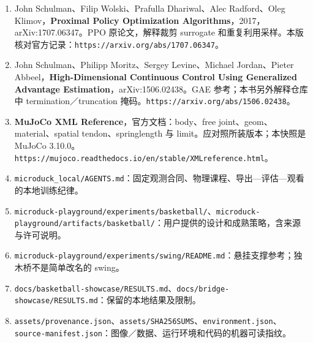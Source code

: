 \documentclass[
  chinese,
  11pt,
  letterpaper,
]{article}
\providecommand{\tightlist}{%
  \setlength{\itemsep}{0pt}\setlength{\parskip}{0pt}}
\begin{document}
\begin{enumerate}
\def\labelenumi{\arabic{enumi}.}
\tightlist
\item
  John Schulman、Filip Wolski、Prafulla Dhariwal、Alec Radford、Oleg
  Klimov，\textbf{Proximal Policy Optimization
  Algorithms}，2017，arXiv:1707.06347。PPO 原论文，解释裁剪 surrogate
  和重复利用采样。本版核对官方记录：\texttt{https://arxiv.org/abs/1707.06347}。
\item
  John Schulman、Philipp Moritz、Sergey Levine、Michael Jordan、Pieter
  Abbeel，\textbf{High-Dimensional Continuous Control Using Generalized
  Advantage Estimation}，arXiv:1506.02438。GAE 参考；本书另外解释仓库中
  termination／truncation
  掩码。\texttt{https://arxiv.org/abs/1506.02438}。
\item
  \textbf{MuJoCo XML Reference}，官方文档：body、free
  joint、geom、material、spatial tendon、springlength 与
  limit。应对照所装版本；本快照是 MuJoCo
  3.10.0。\texttt{https://mujoco.readthedocs.io/en/stable/XMLreference.html}。
\item
  \texttt{microduc\allowbreak{}k\_\allowbreak{}local/\allowbreak{}AGENTS.m\allowbreak{}d}：固定观测合同、物理课程、导出---评估---观看的本地训练纪律。
\item
  \texttt{microduc\allowbreak{}k-\allowbreak{}playgrou\allowbreak{}nd/\allowbreak{}experime\allowbreak{}nts/\allowbreak{}basketba\allowbreak{}ll/\allowbreak{}}、\texttt{microduc\allowbreak{}k-\allowbreak{}playgrou\allowbreak{}nd/\allowbreak{}artifact\allowbreak{}s/\allowbreak{}basketba\allowbreak{}ll/\allowbreak{}}：用户提供的设计和成熟策略，含来源与许可说明。
\item
  \texttt{microduc\allowbreak{}k-\allowbreak{}playgrou\allowbreak{}nd/\allowbreak{}experime\allowbreak{}nts/\allowbreak{}swing/\allowbreak{}README.m\allowbreak{}d}：悬挂支撑参考；独木桥不是简单改名的
  swing。
\item
  \texttt{docs/\allowbreak{}basketba\allowbreak{}ll-\allowbreak{}showcase\allowbreak{}/\allowbreak{}RESULTS.\allowbreak{}md}、\texttt{docs/\allowbreak{}bridge-\allowbreak{}showcase\allowbreak{}/\allowbreak{}RESULTS.\allowbreak{}md}：保留的本地结果及限制。
\item
  \texttt{assets/\allowbreak{}provenan\allowbreak{}ce.json}、\texttt{assets/\allowbreak{}SHA256SU\allowbreak{}MS}、\texttt{environm\allowbreak{}ent.json\allowbreak{}}、\texttt{source-\allowbreak{}manifest\allowbreak{}.json}：图像／数据、运行环境和代码的机器可读指纹。
\end{enumerate}
\end{document}
